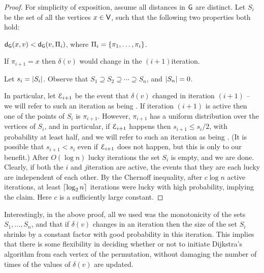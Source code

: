 \begin{proof}
    For simplicity of exposition, assume all distances in $\mathsf{G}$ are
    distinct.  Let $S_i$ be the set of all the vertices
    $x \in \mathsf{V}$, such that the following two properties both
    hold: \medskip %
    \begin{compactenumA}
        \item $\distG{x}{v} < \distG{v}{\Pi_i}$, where
        $\Pi_i = \left\{ {\pi_1,\ldots, \pi_i} \right\}$.
        \smallskip%
        \item If $\pi_{i+1}=x$ then $\delta(v)$ would change in the
        $(i+1)$\th iteration.
    \end{compactenumA}
    \medskip%
    Let $s_i = \left| {S_i} \right|$.  Observe that
    $S_1 \supseteq S_2 \supseteq \cdots \supseteq S_n$, and
    $\left| {S_n} \right| = 0$.
    
    In particular, let $\EuScript{E}_{i+1}$ be the event that $\delta(v)$
    changed in iteration $(i+1)$ -- we will refer to such an iteration
    as being . If iteration $(i+1)$ is active then one
    of the points of $S_i$ is $\pi_{i+1}$. However, $\pi_{i+1}$ has a
    uniform distribution over the vertices of $S_{i}$, and in
    particular, if $\EuScript{E}_{i+1}$ happens then $s_{i+1} \leq s_i/2$,
    with probability at least half, and we will refer to such an
    iteration as being . (It is possible that
    $s_{i+1} < s_i$ even if $\EuScript{E}_{i+1}$ does not happen, but this
    is only to our benefit.)  After $O( \log n)$ lucky iterations the
    set $S_i$ is empty, and we are done. Clearly, if both the $i$\th
    and $j$\th iteration are active, the events that they are each
    lucky are independent of each other. By the Chernoff inequality,
    after $c \log n$ active iterations, at least $\left\lceil { \log_2 n } \right\rceil$
    iterations were lucky with high probability, implying the
    claim. Here $c$ is a sufficiently large constant.
\end{proof}

Interestingly, in the above proof, all we used was the monotonicity of
the sets $S_1, \ldots, S_n$, and that if $\delta(v)$ changes in an
iteration then the size of the set $S_i$ shrinks by a constant factor
with good probability in this iteration. This implies that there is
some flexibility in deciding whether or not to initiate Dijkstra's
algorithm from each vertex of the permutation, without damaging the
number of times of the values of $\delta(v)$ are updated.

